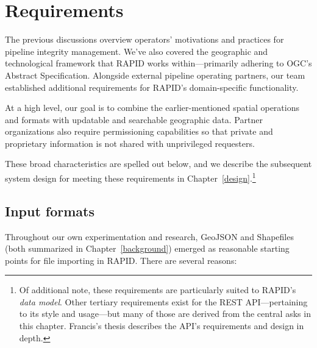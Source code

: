 \chapter{Requirements}
\label{requirements}

The previous discussions overview operators' motivations and practices for pipeline integrity management. We've also covered the geographic and technological framework that RAPID works within---primarily adhering to OGC's Abstract Specification. Alongside external pipeline operating partners, our team established additional requirements for RAPID's domain-specific functionality.

At a high level, our goal is to combine the earlier-mentioned spatial operations and formats with updatable and searchable  geographic data. Partner organizations also require permissioning capabilities so that private and proprietary information is not shared with unprivileged requesters.

These broad characteristics are spelled out below, and we describe the subsequent system design for meeting these requirements in Chapter~\ref{design}.\footnote{Of additional note, these requirements are particularly suited to RAPID's \textit{data model}. Other tertiary requirements exist for the REST API---pertaining to its style and usage---but many of those are derived from the central asks in this chapter. Francis's thesis describes the API's requirements and design in depth.}

\section{Input formats}

Throughout our own experimentation and research, GeoJSON and Shapefiles (both summarized in Chapter~\ref{background}) emerged as reasonable starting points for file importing in RAPID. There are several reasons:


